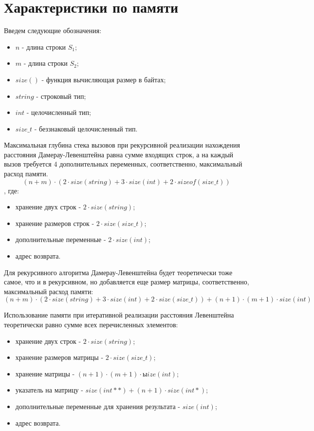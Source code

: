 \section{Характеристики по памяти}

Введем следующие обозначения:
\begin{itemize}
	\item$n$ - длина строки $S_{1}$;
	\item$m$ - длина строки $S_{2}$;
	\item$size()$ - функция вычисляющая размер в байтах;
	\item $string$ - строковый тип;
	\item $int$ - целочисленный тип;
	\item $size\_t$ - беззнаковый целочисленный тип.
\end{itemize}

Максимальная глубина стека вызовов при рекурсивной реализации нахождения расстояния Дамерау-Левенштейна равна сумме входящих строк, а на каждый вызов требуется 4 дополнительных переменных, соответственно, максимальный расход памяти.
\begin{equation}
	(n + m) \cdot (2 \cdot size(string) + 3 \cdot size(int) + 2 \cdot sizeof(size\_t))
\end{equation}
, где:
\begin{itemize}
	\item хранение двух строк - $2 \cdot size(string)$;
	\item хранение размеров строк - $2 \cdot size(size\_t)$;
	\item дополнительные переменные - $2 \cdot size(int)$;
	\item адрес возврата.
\end{itemize}

Для рекурсивного алгоритма Дамерау-Левенштейна будет теоретически тоже самое, что и в рекурсивном, но добавляется еще размер матрицы, соответственно, максимальный расход памяти:
\begin{equation}
	(n + m) \cdot (2 \cdot size(string) + 3 \cdot size(int) + 2 \cdot size(size\_t)) + (n + 1) \cdot (m + 1) \cdot size(int)
\end{equation}

Использование памяти при итеративной реализации расстояния Левенштейна теоретически равно сумме всех перечисленных элементов:
\begin{itemize}
	\item хранение двух строк - $2 \cdot size(string)$;
	\item хранение размеров матрицы - $2 \cdot size(size\_t)$;
	\item хранение матрицы - $(n + 1) \cdot (m + 1) \cdot ыize(int)$;
	\item указатель на матрицу - $size(int **) + (n + 1) \cdot size(int *)$;
	\item дополнительные переменные для хранения результата - $size(int)$;
	\item адрес возврата.
\end{itemize}

